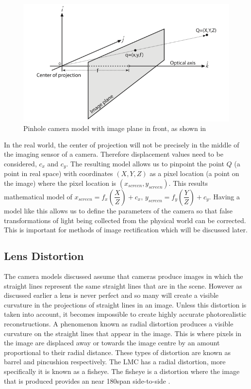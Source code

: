 \documentclass[11pt,oneside]{report}
\begin{document}
				\begin{figure}[!ht]
				\centering
					\includegraphics[width=\textwidth]{pinhole2}
					\caption{Pinhole camera model with image plane in front, as shown in \protect{} {\label{fig:pinhole2}}}

				\end{figure}
				In the real world, the center of projection will not be precisely in the middle of the imaging sensor of a camera.
				Therefore displacement values need to be considered, $c_{x}$ and $c_{y}$.
				The resulting model allows us to pinpoint the point $Q$ (a point in real space) with coordinates $(X,Y,Z)$ as a pixel location (a point on the image) where the pixel location is $(x_{screen}, y_{screen})$.
				This results mathematical model of $x_{screen}=f_{x}\left(\dfrac{X}{Z}\right)+c_{x}$, $y_{screen}=f_{y}\left(\dfrac{Y}{Z}\right)+c_{y}$.
				Having a model like this allows us to define the parameters of the camera so that false transformations of light being collected from the physical world can be corrected.
				This is important for methods of image rectification which will be discussed later.
				\subsection{Lens Distortion}
					The camera models discussed assume that cameras produce images in which the straight lines represent the same straight lines that are in the scene.
					However as discussed earlier a lens is never perfect and so many will create a visible curvature in the projections of straight lines in an image.
					Unless this distortion is taken into account, it becomes impossible to create highly accurate photorealistic reconstructions.
					A phenomenon known as radial distortion produces a visible curvature on the straight lines that appear in the image.
					This is where pixels in the image are displaced away or towards the image centre by an amount proportional to their radial distance.
					These types of distortion are known as barrel and pincushion respectively.
					The LMC has a radial distortion, more specifically it is known as a fisheye.
					The fisheye is a distortion where the image that is produced provides an near 180\degree span side-to-side \cite{book:sam}.
					
\end{document}
